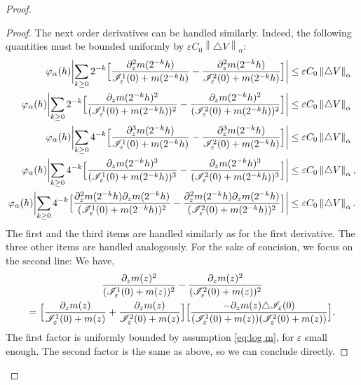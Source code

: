 \documentclass[JEP,XML,SOM,Unicode]{cedram}
\let\mathcal\mathscr
\newcommand{\cI}{\mathcal{I}}
\theoremstyle{plain}
\theoremstyle{definition}
\let\eps\varepsilon
\newcommand{\bbabs}[1]{\biggl\lvert#1\biggr\rvert}
\newcommand{\nalph}[1]{\left\lVert#1\right\rVert_\alpha}
\newcommand{\vphia}{\varphi_\alpha}
\begin{document}
\begin{proof}
\begin{proof}
The next order derivatives can be handled similarly. Indeed, the following quantities must be bounded uniformly by $\eps C_{0} \nalph{\triangle V}$:
\begin{align*}
\vphia(h) \bbabs{ \sum_{k \geq 0} 2^{-k} \Bigl[ \dfrac{\partial_z^2 m(2^{-k}h)}{\cI_\eps^1(0)+m(2^{-k}h)}-\dfrac{\partial_z^2 m(2^{-k}h)}{\cI_\eps^2(0)+m(2^{-k}h)} \Bigr] }& \leq\eps C_{0} \nalph{\triangle V}\\
\vphia(h) \bbabs{\sum_{k \geq 0} 2^{-k} \Bigl[ \dfrac{\partial_z m(2^{-k}h)^2}{(\cI_\eps^1(0)+m(2^{-k}h))^2}- \dfrac{\partial_z m(2^{-k}h)^2}{(\cI_\eps^2(0)+m(2^{-k}h))^2} \Bigr] }& \leq \eps C_{0} \nalph{\triangle V} \\
\vphia(h) \bbabs{ \sum_{k \geq 0} 4^{-k} \Bigl[ \dfrac{\partial_z^3 m(2^{-k}h)}{\cI_\eps^1(0)+m(2^{-k}h)}-\dfrac{\partial_z^3 m(2^{-k}h)}{\cI_\eps^2(0)+m(2^{-k}h)} \Bigr] }& \leq\eps C_{0} \nalph{\triangle V} \\
\vphia(h) \bbabs{\sum_{k \geq 0} 4^{-k} \Bigl [ \dfrac{\partial_z m(2^{-k}h)^3}{(\cI_\eps^1(0)+m(2^{-k}h))^3} -\dfrac{\partial_z m(2^{-k}h)^3}{(\cI_\eps^2(0)+m(2^{-k}h))^3} \Bigr ] }& \leq\eps C_{0} \nalph{\triangle V},\\
\vphia(h) \bbabs{ \sum_{k \geq 0} 4^{-k} \Bigl [ \dfrac{\partial^2_z m(2^{-k}h)\partial_z m(2^{-k}h)}{(\cI_\eps^1	 (0)+m(2^{-k}h))^2} -\dfrac{\partial^2_z m(2^{-k}h)\partial_z m(2^{-k}h)}{(\cI_\eps^2(0)+m(2^{-k}h))^2} \Bigr ]} & \leq \eps C_{0} \nalph{\triangle V}.
\end{align*}
The first and the third items are handled similarly as for the first derivative. The three other items are handled analogously. For the sake of concision, we focus on the second line:
We have,\vspace*{-3pt}
\begin{multline*}
\dfrac{\partial_z m(z)^2}{(\cI_\eps^1(0)+m(z))^2}- \dfrac{\partial_z m(z)^2}{(\cI_\eps^2(0)+m(z))^2} \\
= \Bigl[ \dfrac{\partial_z m(z)}{\cI_\eps^1(0)+m(z)}+\dfrac{\partial_z m(z)}{\cI_\eps^2(0)+m(z)} \Bigr] \Bigl[ \dfrac{- \partial_z m(z) \triangle \cI_\eps (0) }{(\cI_\eps^1(0)+m(z))(\cI_\eps^2(0)+m(z))} \Bigr].
\end{multline*}
The first factor is uniformly bounded by assumption \eqref{eq:log m}, for $\eps$ small enough. The second factor is the same as above, so we can conclude directly.
\end{proof}


\end{proof}
\end{document}
